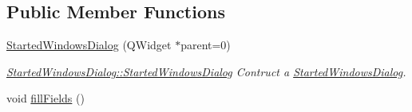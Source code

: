 \subsection*{Public Member Functions}
\begin{DoxyCompactItemize}
\item 
\hyperlink{classGui_1_1Dialogs_1_1StartedWindowsDialog_a978449729fbfc503919f29d1d2c7b4f6}{Started\-Windows\-Dialog} (Q\-Widget $\ast$parent=0)
\begin{DoxyCompactList}\small\item\em \hyperlink{classGui_1_1Dialogs_1_1StartedWindowsDialog_a978449729fbfc503919f29d1d2c7b4f6}{Started\-Windows\-Dialog\-::\-Started\-Windows\-Dialog} Contruct a \hyperlink{classGui_1_1Dialogs_1_1StartedWindowsDialog}{Started\-Windows\-Dialog}. \end{DoxyCompactList}\item 
\hypertarget{classGui_1_1Dialogs_1_1StartedWindowsDialog_a30d97171779c86ecc497ef6990829fca}{void \hyperlink{classGui_1_1Dialogs_1_1StartedWindowsDialog_a30d97171779c86ecc497ef6990829fca}{fill\-Fields} ()}\label{classGui_1_1Dialogs_1_1StartedWindowsDialog_a30d97171779c86ecc497ef6990829fca}


\end{DoxyCompactItemize}

